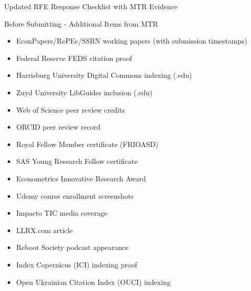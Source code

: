 \documentclass[11pt]{beamer}
\begin{document}
	\begin{frame}{Updated RFE Response Checklist with MTR Evidence}
		\scriptsize
		\begin{block}{Before Submitting - Additional Items from MTR}
			\begin{itemize}
				\item [$\square$] EconPapers/RePEc/SSRN working papers (with submission timestamps)
				\item [$\square$] Federal Reserve FEDS citation proof
				\item [$\square$] Harrisburg University Digital Commons indexing (.edu)
				\item [$\square$] Zuyd University LibGuides inclusion (.edu)
				\item [$\square$] Web of Science peer review credits
				\item [$\square$] ORCID peer review record
				\item [$\square$] Royal Fellow Member certificate (FRIOASD)
				\item [$\square$] SAS Young Research Fellow certificate
				\item [$\square$] Econometrics Innovative Research Award
				\item [$\square$] Udemy course enrollment screenshots
				\item [$\square$] Impacto TIC media coverage
				\item [$\square$] LLRX.com article
				\item [$\square$] Reboot Society podcast appearance
				\item [$\square$] Index Copernicus (ICI) indexing proof
				\item [$\square$] Open Ukrainian Citation Index (OUCI) indexing
			\end{itemize}
		\end{block}
	\end{frame}
	
\end{document}
